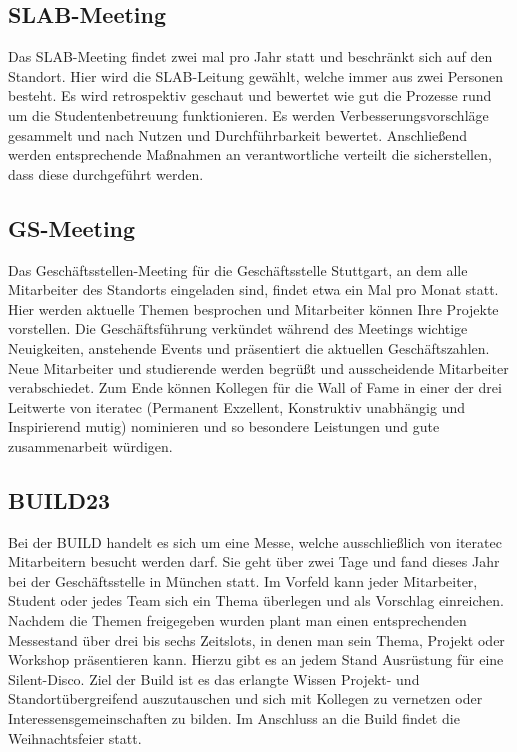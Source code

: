 \subsection{SLAB-Meeting}
Das SLAB-Meeting findet zwei mal pro Jahr statt und beschränkt sich auf den Standort. Hier wird die SLAB-Leitung gewählt, welche immer aus zwei Personen besteht.
Es wird retrospektiv geschaut und bewertet wie gut die Prozesse rund um die Studentenbetreuung funktionieren. Es werden Verbesserungsvorschläge gesammelt und nach Nutzen und 
Durchführbarkeit bewertet. Anschließend werden entsprechende Maßnahmen an verantwortliche verteilt die sicherstellen, dass diese durchgeführt werden.

\subsection{GS-Meeting}
Das Geschäftsstellen-Meeting für die Geschäftsstelle Stuttgart, an dem alle Mitarbeiter des Standorts eingeladen sind, findet etwa ein Mal pro Monat statt. 
Hier werden aktuelle Themen besprochen und Mitarbeiter können Ihre Projekte vorstellen. Die Geschäftsführung verkündet während des Meetings wichtige Neuigkeiten, anstehende Events und präsentiert die 
aktuellen Geschäftszahlen. Neue Mitarbeiter und studierende werden begrüßt und ausscheidende Mitarbeiter verabschiedet. Zum Ende können Kollegen für die Wall of Fame in einer der drei Leitwerte von 
iteratec (Permanent Exzellent, Konstruktiv unabhängig und Inspirierend mutig) nominieren und so besondere Leistungen und gute zusammenarbeit würdigen.

\subsection{BUILD23}
Bei der BUILD handelt es sich um eine Messe, welche ausschließlich von iteratec Mitarbeitern besucht werden darf. Sie geht über zwei Tage und fand dieses Jahr bei der Geschäftsstelle in 
München statt. Im Vorfeld kann jeder Mitarbeiter, Student oder jedes Team sich ein Thema überlegen und als Vorschlag einreichen. Nachdem die Themen freigegeben wurden plant man einen 
entsprechenden Messestand über drei bis sechs Zeitslots, in denen man sein Thema, Projekt oder Workshop präsentieren kann. Hierzu gibt es an jedem Stand Ausrüstung für eine Silent-Disco.
Ziel der Build ist es das erlangte Wissen Projekt- und Standortübergreifend auszutauschen und sich mit Kollegen zu vernetzen oder Interessensgemeinschaften zu bilden. Im Anschluss an die 
Build findet die Weihnachtsfeier statt.

